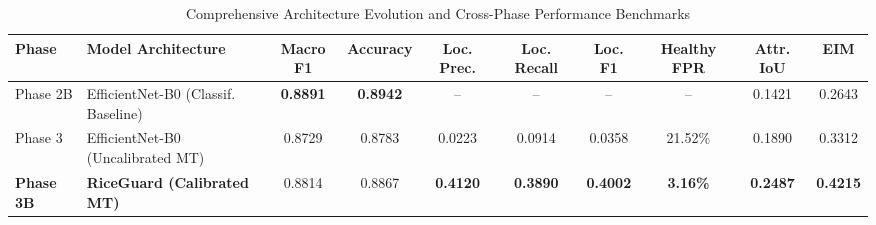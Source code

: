 \begin{table}[htbp]
\centering
\caption{Comprehensive Architecture Evolution and Cross-Phase Performance Benchmarks}
\label{tab:master_evolution}
\begin{tabular}{llcccccccc}
\hline
\textbf{Phase} & \textbf{Model Architecture} & \textbf{Macro F1} & \textbf{Accuracy} & \textbf{Loc. Prec.} & \textbf{Loc. Recall} & \textbf{Loc. F1} & \textbf{Healthy FPR} & \textbf{Attr. IoU} & \textbf{EIM} \\
\hline
Phase 2B & EfficientNet-B0 (Classif. Baseline) & \textbf{0.8891} & \textbf{0.8942} & -- & -- & -- & -- & 0.1421 & 0.2643 \\
Phase 3 & EfficientNet-B0 (Uncalibrated MT) & 0.8729 & 0.8783 & 0.0223 & 0.0914 & 0.0358 & 21.52\% & 0.1890 & 0.3312 \\
\textbf{Phase 3B} & \textbf{RiceGuard (Calibrated MT)} & 0.8814 & 0.8867 & \textbf{0.4120} & \textbf{0.3890} & \textbf{0.4002} & \textbf{3.16\%} & \textbf{0.2487} & \textbf{0.4215} \\
\hline
\end{tabular}
\end{table}
